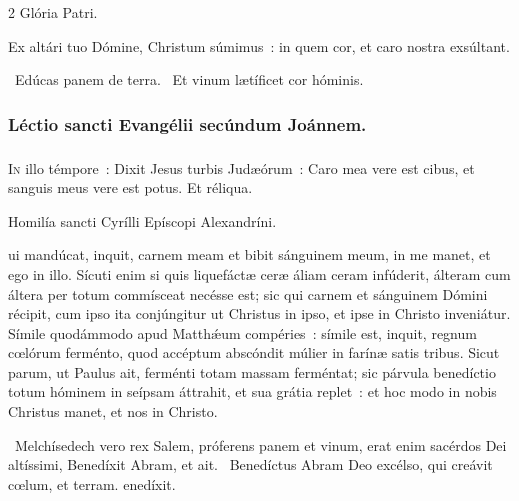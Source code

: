 \documentclass[9pt,twoside]{extarticle}
\begin{document}
\begin{multicols}{2}
Glória Patri.

\begin{tightlist}{}
\item {} Ex altári tuo Dómine, Christum súmimus~: in quem cor, et caro nostra exsúltant.
\item {}~Edúcas panem de terra. ~Et vinum lætíficet cor hóminis.
\end{tightlist}

\subsubsection*{\center Léctio sancti Evangélii secúndum Joánnem.}
\subsubsection*{\center {}}
\lettrine{I}n illo témpore~: Dixit Jesus turbis Judæórum~: Caro mea vere est cibus, et sanguis meus vere est potus. Et réliqua.

\begin{center}Homilía sancti Cyrílli Epíscopi Alexandríni.\\
 \end{center}
ui mandúcat, inquit, carnem meam et bibit sánguinem meum, in me manet, et ego in illo. Sícuti enim si quis liquefáctæ ceræ áliam ceram infúderit, álteram cum áltera per totum commísceat necésse est; sic qui carnem et sánguinem Dómini récipit, cum ipso ita conjúngitur ut Christus in ipso, et ipse in Christo inveniátur. Símile quodámmodo apud Matthǽum compéries~: símile est, inquit, regnum cœlórum ferménto, quod accéptum abscóndit múlier in farínæ satis tribus. Sicut parum, ut Paulus ait, ferménti totam massam ferméntat; sic párvula benedíctio totum hóminem in seípsam áttrahit, et sua grátia replet~: et hoc modo in nobis Christus manet, et nos in Christo.

\begin{tightlist}{}
\item {}~Melchísedech vero rex Salem, próferens panem et vinum, erat enim sacérdos Dei altíssimi, \textred{*} Benedíxit Abram, et ait. ~Benedíctus Abram Deo excélso, qui creávit cœlum, et terram. enedíxit.
\end{tightlist}


\end{multicols}
\end{document}
